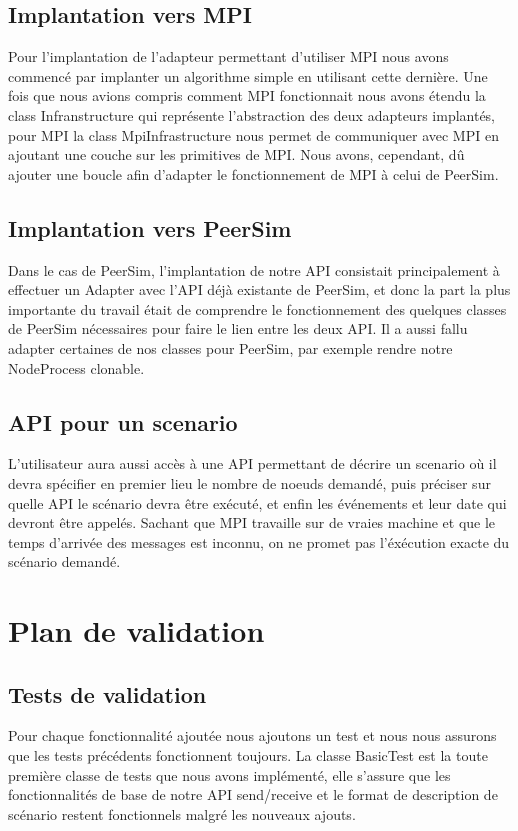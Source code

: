 \documentclass{article}
\begin{document}
			\subsection{Implantation vers MPI}
			Pour l'implantation de l'adapteur permettant d'utiliser MPI nous avons commencé par implanter un algorithme simple en utilisant cette dernière.
			Une fois que nous avions compris comment MPI fonctionnait nous avons étendu la class Infranstructure qui représente l'abstraction des deux adapteurs implantés, pour MPI la class MpiInfrastructure nous permet de communiquer avec MPI en ajoutant  une couche sur les primitives de MPI.
			Nous avons, cependant, dû ajouter une boucle  afin d'adapter le fonctionnement de MPI à celui de PeerSim.
			\subsection{Implantation vers PeerSim}
			Dans le cas de PeerSim, l'implantation de notre API consistait principalement à effectuer un Adapter avec l'API déjà existante de PeerSim, et donc la part la plus importante du travail était de comprendre le fonctionnement des quelques classes de PeerSim nécessaires pour faire le lien entre les deux API. Il a aussi fallu adapter certaines de nos classes pour PeerSim, par exemple rendre notre NodeProcess clonable. 
			\subsection{API pour un scenario}
			L'utilisateur aura aussi accès à une API permettant de décrire un scenario où il devra spécifier en premier lieu
			le nombre de noeuds demandé, puis préciser sur quelle API le scénario devra être exécuté, et enfin les événements et leur date qui devront être appelés.
			Sachant que MPI travaille sur de vraies machine et que le temps d'arrivée des messages est inconnu, on ne promet pas l'éxécution exacte du scénario demandé. 

		\section{Plan de validation}
		\subsection{Tests de validation}
		Pour chaque fonctionnalité ajoutée nous ajoutons un test et nous nous assurons que les tests précédents fonctionnent toujours.
		\newline
		La classe BasicTest est la toute première classe de tests que nous avons implémenté, elle s'assure que les fonctionnalités de base de notre API
		send/receive et le format de description de scénario restent fonctionnels malgré les nouveaux ajouts.
\end{document}
